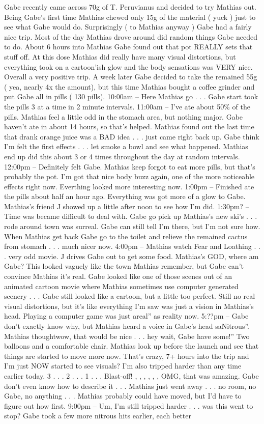 \documentclass[12pt]{book}
\begin{document}
Gabe recently came across 70g of T. Peruvianus and decided to try Mathias out. Being Gabe's first time Mathias chewed only 15g of the material ( yuck ) just to see what Gabe would do. Surprisingly ( to Mathias anyway ) Gabe had a fairly nice trip. Most of the day Mathias drove around did random things Gabe needed to do. About 6 hours into Mathias Gabe found out that pot REALLY sets that stuff off. At this dose Mathias did really have many visual distortions, but everything took on a cartoon'ish glow and the body sensations was VERY nice. Overall a very positive trip. A week later Gabe decided to take the remained 55g ( yea, nearly 4x the amount), but this time Mathias bought a coffee grinder and put Gabe all in pills ( 130 pills). 10:00am -- Here Mathias go . . .  Gabe start took the pills 3 at a time in 2 minute intervals. 11:00am -- I've ate about 50\% of the pills. Mathias feel a little odd in the stomach area, but nothing major. Gabe haven't ate in about 14 hours, so that's helped. Mathias found out the last time that drank orange juice was a BAD idea . . .  just came right back up. Gabe think I'm felt the first effects . . .  let smoke a bowl and see what happened. Mathias end up did this about 3 or 4 times throughout the day at random intervals. 12:00pm -- Definitely felt Gabe. Mathias keep forgot to eat more pills, but that's probably the pot. I'm got that nice body buzz again, one of the more noticeable effects right now. Everthing looked more interesting now. 1:00pm -- Finished ate the pills about half an hour ago. Everything was got more of a glow to Gabe. Mathias's friend J showed up a little after noon to see how I'm did. 1:30pm? -- Time was became difficult to deal with. Gabe go pick up Mathias's new ski's . . .  rode around town was surreal. Gabe can still tell I'm there, but I'm not sure how. When Mathias get back Gabe go to the toilet and relieve the remained cactus from stomach . . .  much nicer now. 4:00pm -- Mathias watch Fear and Loathing . . .  very odd movie. J drives Gabe out to get some food. Mathias's GOD, where am Gabe? This looked vaguely like the town Mathias remember, but Gabe can't convince Mathias it's real. Gabe looked like one of those scenes out of an animated cartoon movie where Mathias sometimes use computer generated scenery . . .  Gabe still looked like a cartoon, but a little too perfect. Still no real visual distortions, but it's like everything I'm saw was just a vision in Mathias's head. Playing a computer game was just areal'' as reality now. 5:??pm -- Gabe don't exactly know why, but Mathias heard a voice in Gabe's head saNitrous''. Mathias thoughtwow, that would be nice . . .  hey wait, Gabe have some!'' Two balloons and a comfortable chair. Mathias look up before the launch and see that things are started to move more now. That's crazy, 7+ hours into the trip and I'm just NOW started to see visuals? I'm also tripped harder than any time earlier today. 3 . . .  2 . . .  1 . . .  Blast-off! , , , , , , OMG, that was amazing. Gabe don't even know how to describe it . . .  Mathias just went away . . .  no room, no Gabe, no anything . . .  Mathias probably could have moved, but I'd have to figure out how first. 9:00pm -- Um, I'm still tripped harder . . .  was this went to stop? Gabe took a few more nitrous hits earlier, each better 
\end{document}
